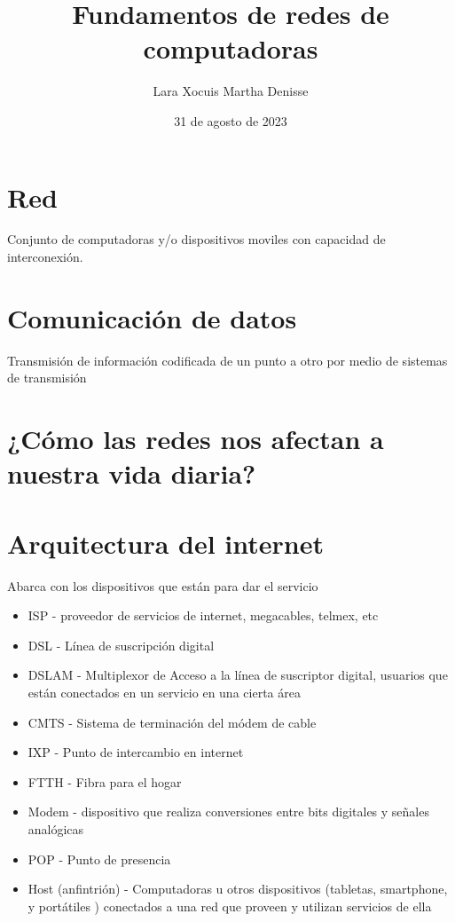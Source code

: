 \documentclass[letterpaper,12pt]{article}
\title {\textbf{Fundamentos de redes de computadoras}}
\author{Lara Xocuis Martha Denisse}
\date{31 de agosto de 2023}
\begin{document}
\maketitle
\newpage
\begin{sloppypar}
\section{Red}
Conjunto de computadoras y/o dispositivos moviles con capacidad de interconexión.

\section{Comunicación de datos}
Transmisión de información codificada de un punto a otro por medio de sistemas de transmisión

\section{¿Cómo las redes nos afectan a nuestra vida diaria?}

\section{Arquitectura del internet}
Abarca con los dispositivos que están para dar el servicio
\begin{itemize}
    \item ISP - proveedor de servicios de internet, megacables, telmex, etc 
    \item DSL - Línea de suscripción digital 
    \item DSLAM - Multiplexor de Acceso a la línea de suscriptor digital, usuarios que están conectados en un servicio en una cierta área
    \item CMTS - Sistema de terminación del módem de cable 
    \item IXP - Punto de intercambio en internet 
    \item FTTH - Fibra para el hogar 
    \item Modem - dispositivo que realiza conversiones entre bits digitales y señales analógicas 
    \item POP - Punto de presencia 
    \item Host (anfintrión) - Computadoras u otros dispositivos (tabletas, smartphone, y portátiles ) conectados a una red que proveen y utilizan servicios de ella
\end{itemize}

\end{sloppypar}
\end{document}
